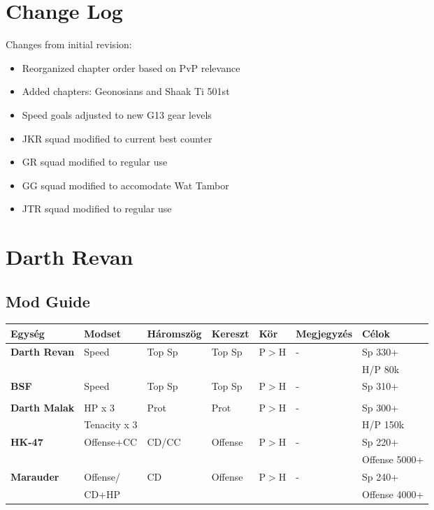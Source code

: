 \documentclass[11pt]{report}
\begin{document}

\chapter{Change Log}
Changes from initial revision:
\begin{itemize}
    \item Reorganized chapter order based on PvP relevance
    \item Added chapters: Geonosians and Shaak Ti 501st
    \item Speed goals adjusted to new G13 gear levels
    \item JKR squad modified to current best counter
    \item GR squad modified to regular use
    \item GG squad modified to accomodate Wat Tambor
    \item JTR squad modified to regular use
\end{itemize}


\chapter{Darth Revan}
\section{Mod Guide}
\begin{center}
    \begin{tabular}{|l | l | l | l | l | l | l |}
        \hline
        Egység & Modset & Háromszög & Kereszt & Kör & Megjegyzés & Célok\\ \hline
        \textbf{Darth Revan} & Speed & Top Sp & Top Sp & P$>$H & - & Sp 330+\\ 
        &  &  &  &  &  & H/P 80k\\ \hline
        \textbf{BSF} & Speed & Top Sp & Top Sp & P$>$H & - & Sp 310+\\
        &  &  &  &  &  & \\ \hline
        \textbf{Darth Malak} & HP x 3 & Prot & Prot & P$>$H & - & Sp 300+\\
        & Tenacity x 3 &  &  &  &  & H/P 150k\\ \hline
        \textbf{HK-47} & Offense+CC & CD/CC & Offense & P$>$H & - & Sp 220+\\
        &  &  &  &  &  & Offense 5000+\\ \hline
        \textbf{Marauder} & Offense/ & CD & Offense & P$>$H & - & Sp 240+\\
        & CD+HP &  &  &  &  & Offense 4000+\\ \hline
    \end{tabular}
\end{center}
\end{document}
